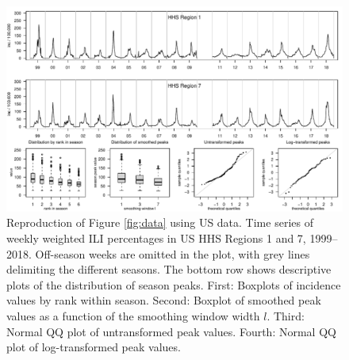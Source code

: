 \documentclass{article}
\begin{document}
\begin{figure}[h]
\center
\includegraphics[width=1\textwidth]{figure/plot_data_us.pdf}
\caption{Reproduction of Figure \ref{fig:data} using US data. Time series of weekly weighted ILI percentages in US HHS Regions 1 and 7, 1999--2018. Off-season weeks are omitted in the plot, with grey lines delimiting the different seasons. The bottom row shows descriptive plots of the distribution of season peaks. First: Boxplots of incidence values by rank within season. Second: Boxplot of smoothed peak values as a function of the smoothing window width $l$. Third: Normal QQ plot of untransformed peak values. Fourth: Normal QQ plot of log-transformed peak values.}
\label{fig:data_us}
\end{figure}
\end{document}
